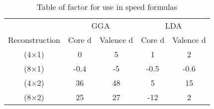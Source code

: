 \documentclass{article}
\begin{document}
	
	
	
	
	
		\begin{table}[h]
		\centering	
		\begin{tabular}{ccccc}   
			\hline \hline
			    & \multicolumn{2}{c}{GGA} & \multicolumn{2}{c}{LDA} \\
	     	Reconstruction	& Core d & Valence d & Core d & Valence d   \\ \hline 
	     	(4$\times$1)	& 0  &  5 & 1 & 2 \\
	     	(8$\times$1)	& -0.4  &  -5 & -0.5 & -0.6 \\
	     	(4$\times$2)	& 36  &  48 & 5 & 15 \\
	     	(8$\times$2)	& 25  &  27 & -12 & 2 \\ \hline \hline
		\end{tabular}
		\caption{Table of factor for use in speed formulas}	
	\end{table}	
	
	
	
	
	
	
	
	
	
	
	
	
	
\end{document}
